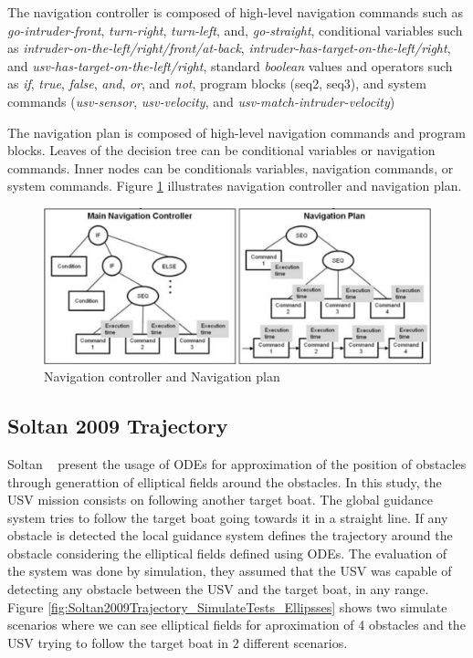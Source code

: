     The navigation controller is composed of high-level navigation commands such as \textit{go-intruder-front}, \textit{turn-right}, \textit{turn-left}, and, \textit{go-straight}, conditional variables such as \textit{intruder-on-the-left/right/front/at-back}, \textit{intruder-has-target-on-the-left/right}, and \textit{usv-has-target-on-the-left/right}, standard \textit{boolean} values and operators such as \textit{if}, \textit{true}, \textit{false}, \textit{and}, \textit{or}, and \textit{not}, program blocks (seq2, seq3), and system commands (\textit{usv-sensor}, \textit{usv-velocity}, and \textit{usv-match-intruder-velocity})
    
    The navigation plan is composed of high-level navigation commands and program blocks.
    Leaves of the decision tree can be conditional variables or navigation commands.
    Inner nodes can be conditionals variables, navigation commands, or system commands.
    Figure \ref{fig:Svec2012Automated_GuidancePlanning} illustrates navigation controller and navigation plan.
    
    \begin{figure}[H]
        \centering
        \includegraphics[scale=0.35]{figs/Chap3/Svec2012Automated_GuidancePlanning.png}
        \caption{Navigation controller and Navigation plan \cite{Svec2011aAutomated, Svec2012Automated}}
        \label{fig:Svec2012Automated_GuidancePlanning}
    \end{figure}
 
    \subsection{Soltan 2009 Trajectory}
    Soltan \etal~\cite{Soltan2009Trajectory} present the usage of \acp{ODE} for approximation of the position of obstacles through generattion of elliptical fields around the obstacles. In this study, the \ac{USV} mission consists on following another target boat. The global guidance system tries to follow the target boat going towards it in a straight line. If any obstacle is detected the local guidance system defines the trajectory around the obstacle considering the elliptical fields defined using \acp{ODE}. The evaluation of the system was done by simulation, they assumed that the \ac{USV} was capable of detecting any obstacle between the \ac{USV} and the target boat, in any range. Figure \ref{fig:Soltan2009Trajectory_SimulateTests_Ellipsses} shows two simulate scenarios where we can see elliptical fields for aproximation of 4 obstacles and the \ac{USV} trying to follow the target boat in 2 different scenarios.
    
